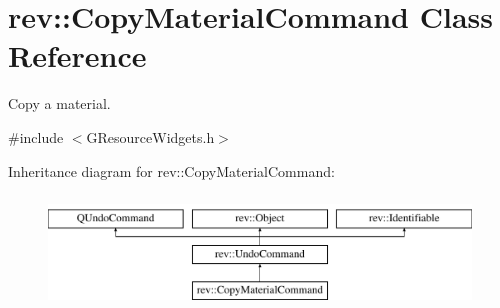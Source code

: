 \hypertarget{classrev_1_1_copy_material_command}{}\section{rev\+::Copy\+Material\+Command Class Reference}
\label{classrev_1_1_copy_material_command}


Copy a material.  




{\ttfamily \#include $<$G\+Resource\+Widgets.\+h$>$}

Inheritance diagram for rev\+::Copy\+Material\+Command\+:\begin{figure}[H]
\begin{center}
\leavevmode
\includegraphics[height=3.000000cm]{classrev_1_1_copy_material_command}
\end{center}
\end{figure}
